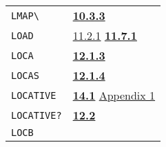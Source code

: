 \documentclass[a4paper]{scrbook}
\begin{document}
\begin{longtable}[]{@{}ll@{}}
\begin{minipage}[t]{0.24\columnwidth}
\texttt{LMAP\textbackslash{}}\strut
\end{minipage} & \begin{minipage}[t]{0.70\columnwidth}\raggedright\strut
\textbf{\href{10-looping.md\#1033-mapleave}{10.3.3}}\strut
\end{minipage}\tabularnewline
\begin{minipage}[t]{0.24\columnwidth}\raggedright\strut
\texttt{LOAD}\strut
\end{minipage} & \begin{minipage}[t]{0.70\columnwidth}\raggedright\strut
\href{11-input-output.md\#1121-open}{11.2.1} \textbf{\href{11-input-output.md\#1171-load}{11.7.1}}\strut
\end{minipage}\tabularnewline
\begin{minipage}[t]{0.24\columnwidth}\raggedright\strut
\texttt{LOCA}\strut
\end{minipage} & \begin{minipage}[t]{0.70\columnwidth}\raggedright\strut
\textbf{\href{12-locatives.md\#1213-at}{12.1.3}}\strut
\end{minipage}\tabularnewline
\begin{minipage}[t]{0.24\columnwidth}\raggedright\strut
\texttt{LOCAS}\strut
\end{minipage} & \begin{minipage}[t]{0.70\columnwidth}\raggedright\strut
\textbf{\href{12-locatives.md\#1214-getpl-and-getl}{12.1.4}}\strut
\end{minipage}\tabularnewline
\begin{minipage}[t]{0.24\columnwidth}\raggedright\strut
\texttt{LOCATIVE}\strut
\end{minipage} & \begin{minipage}[t]{0.70\columnwidth}\raggedright\strut
\textbf{\href{14-data-type-declarations.md\#141-patterns}{14.1}}
\href{appendix-1-a-look-inside.md\#appendix-1-a-look-inside}{Appendix 1}\strut
\end{minipage}\tabularnewline
\begin{minipage}[t]{0.24\columnwidth}\raggedright\strut
\texttt{LOCATIVE?}\strut
\end{minipage} & \begin{minipage}[t]{0.70\columnwidth}\raggedright\strut
\textbf{\href{12-locatives.md\#122-locative}{12.2}}\strut
\end{minipage}\tabularnewline
\begin{minipage}[t]{0.24\columnwidth}\raggedright\strut
\texttt{LOCB}\strut
\end{minipage} & \begin{minipage}[t]{0.70\columnwidth}\raggedright\strut

\end{minipage}
\end{longtable}
\end{document}

